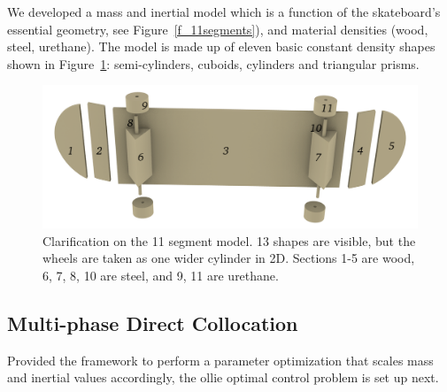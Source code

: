 \documentclass[default,iicol]{sn-jnl}
\theoremstyle{thmstyleone}%
\theoremstyle{thmstyletwo}%
\theoremstyle{thmstylethree}%
\begin{document}
We developed a mass and inertial model which is a function of the skateboard's
essential geometry, see Figure~\ref{f_11segments}), and material densities
(wood, steel, urethane). The model is made up of eleven basic constant density
shapes shown in Figure~\ref{f_basicshapes}: semi-cylinders, cuboids, cylinders
and triangular prisms.
%
\begin{figure}
  \centering
  \includegraphics[width = 0.5 \textwidth]{figure/Basicshapes.png}
  \caption[Exploded 11 segment model]{Clarification on the 11 segment model.
    13 shapes are visible, but the wheels are taken as one wider cylinder in
    2D. Sections 1-5 are wood, 6, 7, 8, 10 are steel, and 9, 11 are urethane.}
  \label{f_basicshapes}
\end{figure}

\subsection{Multi-phase Direct Collocation}\label{s_multiphase}
Provided the framework to perform a parameter optimization that scales mass and inertial values accordingly, the ollie optimal control problem is set up next. 
\end{document}
